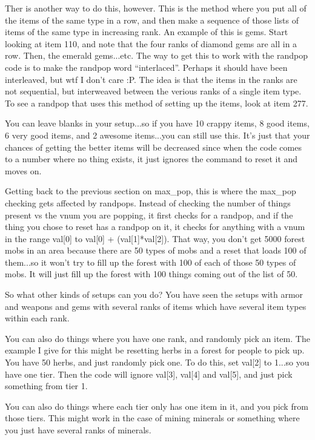 Ther is another way to do this, however. This is the method where
you put all of the items of the same type in a row, and then
make a sequence of those lists of items of the same type in 
increasing rank. An example of this is gems. Start looking at item
110, and note that the four ranks of diamond gems are all in a
row. Then, the emerald gems...etc. The way to get this to work with
the randpop code is to make the randpop word ``interlaced''. Perhaps
it should have been interleaved, but wtf I don't care :P. The idea is
that the items in the ranks are not sequential, but interweaved
between the verious ranks of a single item type. To see a randpop that
uses this method of setting up the items, look at item 277.

You can leave blanks in your setup...so if you have 10 crappy items, 8
good items, 6 very good items, and 2 awesome items...you can still use
this. It's just that your chances of getting the better items will be
decreased since when the code comes to a number where no thing exists,
it just ignores the command to reset it and moves on. 

Getting back to the previous section on max\_pop, this is where the
max\_pop checking gets affected by randpops. Instead of checking
the number of things present vs the vnum you are popping, it
first checks for a randpop, and if the thing you chose to reset
has a randpop on it, it checks for anything with a vnum in the
range val[0] to val[0] + (val[1]*val[2]). That way, you don't
get 5000 forest mobs in an area because there are 50 types of
mobs and a reset that loads 100 of them...so it won't try to
fill up the forest with 100 of each of those 50 types of mobs. It
will just fill up the forest with 100 things coming out of
the list of 50.

So what other kinds of setups can you do? You have seen the setups
with armor and weapons and gems with several ranks of items which have
several item types within each rank. 

You can also do things where you have one rank, and randomly pick an
item. The example I give for this might be resetting herbs in a forest
for people to pick up. You have 50 herbs, and just randomly pick
one. To do this, set val[2] to 1...so you have one tier. Then the code
will ignore val[3], val[4] and val[5], and just pick something from
tier 1. 

You can also do things where each tier only has one item in it, and
you pick from those tiers. This might work in the case of mining
minerals or something where you just have several ranks of minerals.

